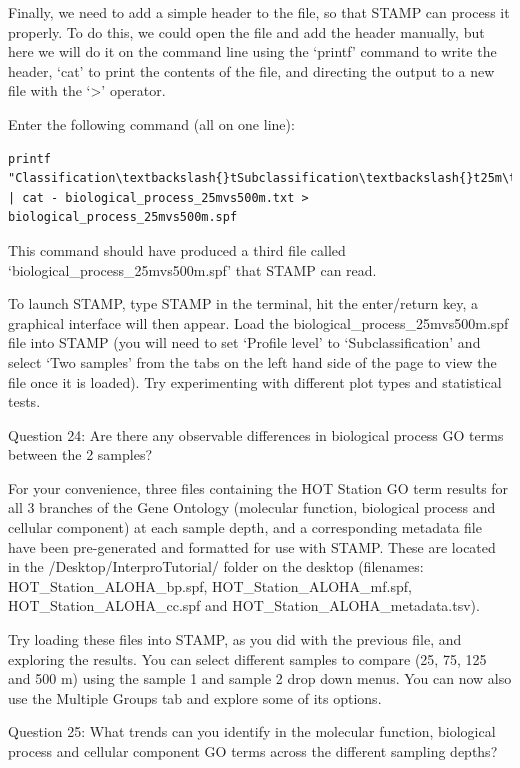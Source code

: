 Finally, we need to add a simple header to the file, so that STAMP can process it properly. To do this, we could open the file and add the header manually, but here we will do it on the command line using the ‘printf’ command to write the header, ‘cat’ to print the contents of the file, and directing the output to a new file with the ‘>’ operator.

\begin{steps}
Enter the following command (all on one line):
\begin{lstlisting}
printf "Classification\textbackslash{}tSubclassification\textbackslash{}t25m\textbackslash{}t500m\textbackslash{}n" | cat - biological_process_25mvs500m.txt > biological_process_25mvs500m.spf
\end{lstlisting}
This command should have produced a third file called ‘biological_process_25mvs500m.spf’ that STAMP can read.
\end{steps}

\begin{steps}
To launch STAMP, type STAMP in the terminal, hit the enter/return key, a graphical interface will then appear. Load the biological_process_25mvs500m.spf file into STAMP (you will need to set ‘Profile level’ to ‘Subclassification’ and select ‘Two samples’ from the tabs on the left hand side of the page to view the file once it is loaded). Try experimenting with different plot types and statistical tests.

Question 24: Are there any observable differences in biological process GO terms between the 2 samples?
\end{steps}

For your convenience, three files containing the HOT Station GO term results for all 3 branches of the Gene Ontology (molecular function, biological process and cellular component) at each sample depth, and a corresponding metadata file have been pre-generated and formatted for use with STAMP. These are located in the /Desktop/InterproTutorial/ folder on the desktop (filenames: HOT_Station_ALOHA_bp.spf, HOT_Station_ALOHA_mf.spf, HOT_Station_ALOHA_cc.spf and HOT_Station_ALOHA_metadata.tsv). 

\begin{steps}
Try loading these files into STAMP, as you did with the previous file, and exploring the results. You can select different samples to compare (25, 75, 125 and 500 m) using the sample 1 and sample 2 drop down menus. You can now also use the Multiple Groups tab and explore some of its options.
  
Question 25: What trends can you identify in the molecular function, biological process and cellular component GO terms across the different sampling depths?
\end{steps}
